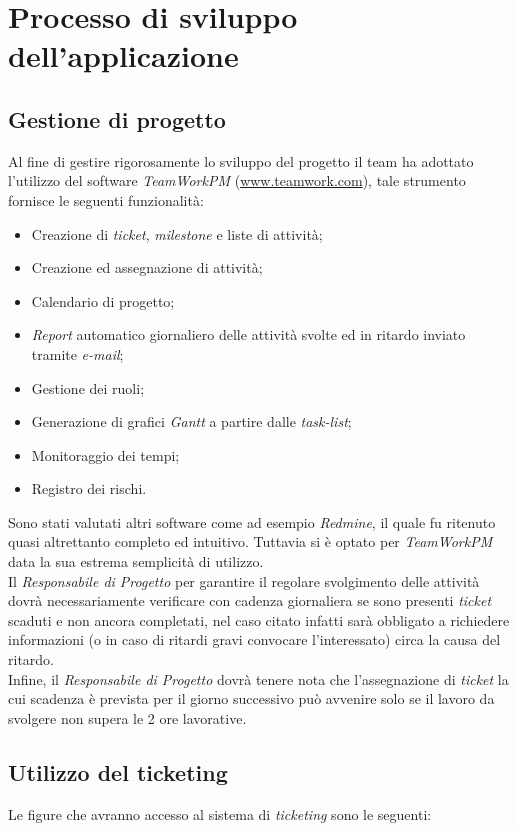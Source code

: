 \section{Processo di sviluppo dell'applicazione}
\subsection{Gestione di progetto}
Al fine di gestire rigorosamente lo sviluppo del progetto il team \gruppo{} ha adottato l'utilizzo del software \textit{TeamWorkPM} (\href{http://www.teamwork.com}{www.teamwork.com}), tale strumento fornisce le seguenti funzionalità:

\begin{itemize}
\item Creazione di \textit{ticket}, \textit{milestone} e liste di attività;
\item Creazione ed assegnazione di attività;
\item Calendario di progetto;
\item \textit{Report} automatico giornaliero delle attività svolte ed in ritardo inviato tramite \textit{e-mail};
\item Gestione dei ruoli;
\item Generazione di grafici \textit{Gantt} a partire dalle \textit{task-list};
\item Monitoraggio dei tempi;
\item Registro dei rischi.
\end{itemize}

Sono stati valutati altri software come ad esempio \textit{Redmine}, il quale fu ritenuto quasi altrettanto completo ed intuitivo. Tuttavia si è optato per \textit{TeamWorkPM} data la sua estrema semplicità di utilizzo.\\
Il \textit{Responsabile di Progetto} per garantire il regolare svolgimento delle attività dovrà necessariamente verificare con cadenza giornaliera se sono presenti \textit{ticket} scaduti e non ancora completati, nel caso citato infatti sarà obbligato a richiedere informazioni (o in caso di ritardi gravi convocare l'interessato) circa la causa del ritardo.\\
Infine, il \textit{Responsabile di Progetto} dovrà tenere nota che l'assegnazione di \textit{ticket} la cui scadenza è prevista per il giorno successivo può avvenire solo se il lavoro da svolgere non supera le 2 ore lavorative.

\subsection{Utilizzo del ticketing}
Le figure che avranno accesso al sistema di \textit{ticketing} sono le seguenti:


